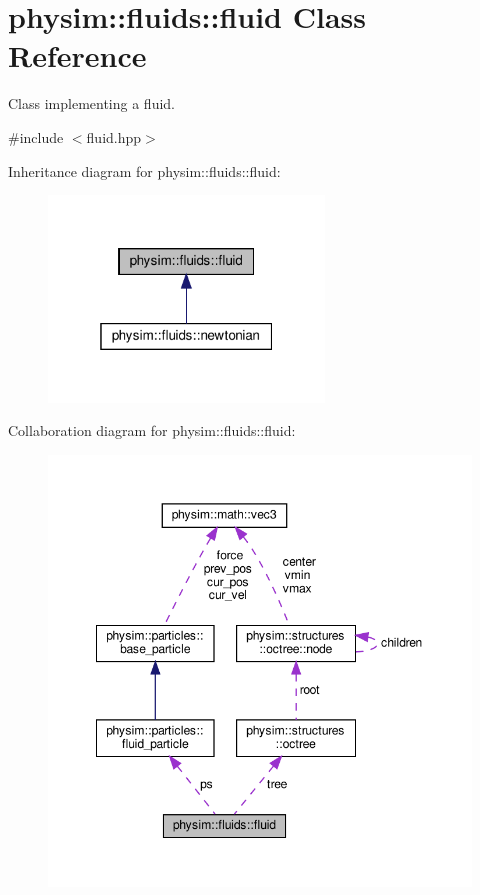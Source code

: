 \hypertarget{classphysim_1_1fluids_1_1fluid}{}\section{physim\+:\+:fluids\+:\+:fluid Class Reference}
\label{classphysim_1_1fluids_1_1fluid}


Class implementing a fluid.  




{\ttfamily \#include $<$fluid.\+hpp$>$}



Inheritance diagram for physim\+:\+:fluids\+:\+:fluid\+:\nopagebreak
\begin{figure}[H]
\begin{center}
\leavevmode
\includegraphics[width=208pt]{classphysim_1_1fluids_1_1fluid__inherit__graph}
\end{center}
\end{figure}


Collaboration diagram for physim\+:\+:fluids\+:\+:fluid\+:\nopagebreak
\begin{figure}[H]
\begin{center}
\leavevmode
\includegraphics[width=349pt]{classphysim_1_1fluids_1_1fluid__coll__graph}
\end{center}
\end{figure}
